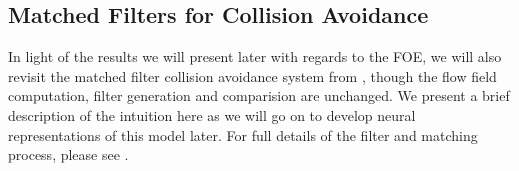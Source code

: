 \documentclass[a4paper,11pt,twoside,openright]{article}
\begin{document}








%

\subsection{Matched Filters for Collision Avoidance}\label{sec:offbg}
In light of the results we will present later with regards to the FOE,
we will also revisit the matched filter collision avoidance system
from \cite{Mitchell2018}, though the flow field computation, filter
generation and comparision are unchanged. We present a brief
description of the intuition here as we will go on to develop neural
representations of this model later. For full details of the filter and
matching process, please see \cite{Mitchell2018}.
\newline\par
\end{document}
